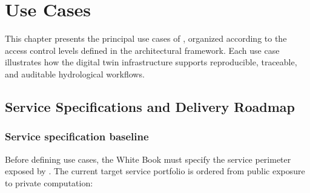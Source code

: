 \chapter{Use Cases}
\label{chap-use-case}

\fancyhead[LE]{\thepage}
\fancyhead[RO]{\thepage}
\renewcommand{\headrulewidth}{1pt}

\setlength{\parindent}{0cm}
\setlength{\parskip}{9pt}

\htastarget



This chapter presents the principal use cases of \hydrot, organized according to the access control levels defined in the architectural framework. Each use case illustrates how the digital twin infrastructure supports reproducible, traceable, and auditable hydrological workflows.


\section{Service Specifications and Delivery Roadmap}

\subsection{Service specification baseline}

Before defining use cases, the White Book must specify the service perimeter exposed by \hydrot. The current target service portfolio is ordered from public exposure to private computation:

